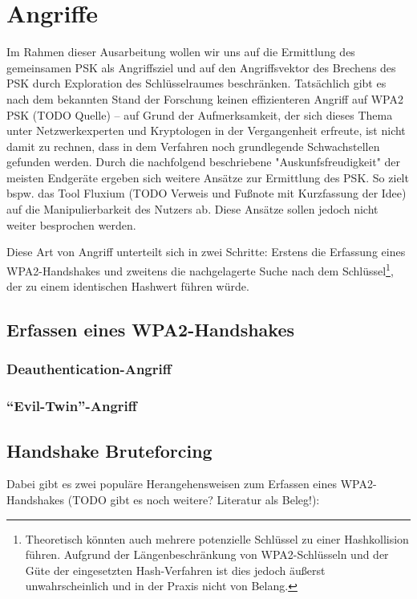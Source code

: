 \section{Angriffe}
Im Rahmen dieser Ausarbeitung wollen wir uns auf die Ermittlung des gemeinsamen PSK als Angriffsziel und auf den Angriffsvektor des Brechens des PSK durch Exploration des Schlüsselraumes beschränken. Tatsächlich gibt es nach dem bekannten Stand der Forschung keinen effizienteren Angriff auf WPA2 PSK (TODO Quelle) -- auf Grund der Aufmerksamkeit, der sich dieses Thema unter Netzwerkexperten und Kryptologen in der Vergangenheit erfreute, ist nicht damit zu rechnen, dass in dem Verfahren noch grundlegende Schwachstellen gefunden werden. Durch die nachfolgend beschriebene "Auskunfsfreudigkeit" der meisten Endgeräte ergeben sich weitere Ansätze zur Ermittlung des PSK. So zielt bspw. das Tool Fluxium (TODO Verweis und Fußnote mit Kurzfassung der Idee) auf die Manipulierbarkeit des Nutzers ab. Diese Ansätze sollen jedoch nicht weiter besprochen werden.

Diese Art von Angriff unterteilt sich in zwei Schritte: Erstens die Erfassung eines WPA2-Handshakes und zweitens die nachgelagerte Suche nach dem Schlüssel\footnote{Theoretisch könnten auch mehrere potenzielle Schlüssel zu einer Hashkollision führen. Aufgrund der Längenbeschränkung von WPA2-Schlüsseln und der Güte der eingesetzten Hash-Verfahren ist dies jedoch äußerst unwahrscheinlich und in der Praxis nicht von Belang.}, der zu einem identischen Hashwert führen würde.

\subsection{Erfassen eines WPA2-Handshakes}
\subsubsection{Deauthentication-Angriff}
\subsubsection{\enquote{Evil-Twin}-Angriff}

\subsection{Handshake Bruteforcing}
Dabei gibt es zwei populäre Herangehensweisen zum Erfassen eines WPA2-Handshakes (TODO gibt es noch weitere? Literatur als Beleg!): 

